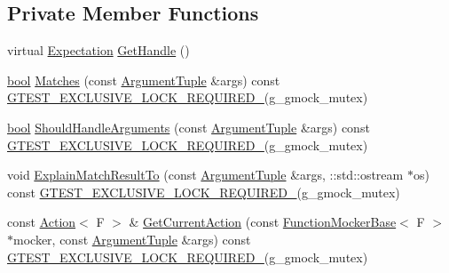 \subsection*{Private Member Functions}
\begin{DoxyCompactItemize}
\item 
virtual \hyperlink{classtesting_1_1Expectation}{Expectation} \hyperlink{classtesting_1_1internal_1_1TypedExpectation_adc2859080623243a3886a80ab62911da}{Get\+Handle} ()
\item 
\hyperlink{classbool}{bool} \hyperlink{classtesting_1_1internal_1_1TypedExpectation_a010336f587859d990b718cd74f13e617}{Matches} (const \hyperlink{classtesting_1_1internal_1_1TypedExpectation_a9a91379262d101f435809ba4556d14fa}{Argument\+Tuple} \&args) const \hyperlink{gtest-port_8h_a149f693bd59fa1bc937af54c0cdcb32f}{G\+T\+E\+S\+T\+\_\+\+E\+X\+C\+L\+U\+S\+I\+V\+E\+\_\+\+L\+O\+C\+K\+\_\+\+R\+E\+Q\+U\+I\+R\+E\+D\+\_\+}(g\+\_\+gmock\+\_\+mutex)
\item 
\hyperlink{classbool}{bool} \hyperlink{classtesting_1_1internal_1_1TypedExpectation_a833f473cc3563f566fbfe143682bd05a}{Should\+Handle\+Arguments} (const \hyperlink{classtesting_1_1internal_1_1TypedExpectation_a9a91379262d101f435809ba4556d14fa}{Argument\+Tuple} \&args) const \hyperlink{gtest-port_8h_a149f693bd59fa1bc937af54c0cdcb32f}{G\+T\+E\+S\+T\+\_\+\+E\+X\+C\+L\+U\+S\+I\+V\+E\+\_\+\+L\+O\+C\+K\+\_\+\+R\+E\+Q\+U\+I\+R\+E\+D\+\_\+}(g\+\_\+gmock\+\_\+mutex)
\item 
void \hyperlink{classtesting_1_1internal_1_1TypedExpectation_ad72e021fb66b7a91613e84644c6eb78b}{Explain\+Match\+Result\+To} (const \hyperlink{classtesting_1_1internal_1_1TypedExpectation_a9a91379262d101f435809ba4556d14fa}{Argument\+Tuple} \&args, \+::std\+::ostream $\ast$os) const \hyperlink{gtest-port_8h_a149f693bd59fa1bc937af54c0cdcb32f}{G\+T\+E\+S\+T\+\_\+\+E\+X\+C\+L\+U\+S\+I\+V\+E\+\_\+\+L\+O\+C\+K\+\_\+\+R\+E\+Q\+U\+I\+R\+E\+D\+\_\+}(g\+\_\+gmock\+\_\+mutex)
\item 
const \hyperlink{classtesting_1_1Action}{Action}$<$ F $>$ \& \hyperlink{classtesting_1_1internal_1_1TypedExpectation_a5053b8335ca295b34cd6a68f8d462602}{Get\+Current\+Action} (const \hyperlink{classtesting_1_1internal_1_1FunctionMockerBase}{Function\+Mocker\+Base}$<$ F $>$ $\ast$mocker, const \hyperlink{classtesting_1_1internal_1_1TypedExpectation_a9a91379262d101f435809ba4556d14fa}{Argument\+Tuple} \&args) const \hyperlink{gtest-port_8h_a149f693bd59fa1bc937af54c0cdcb32f}{G\+T\+E\+S\+T\+\_\+\+E\+X\+C\+L\+U\+S\+I\+V\+E\+\_\+\+L\+O\+C\+K\+\_\+\+R\+E\+Q\+U\+I\+R\+E\+D\+\_\+}(g\+\_\+gmock\+\_\+mutex)

\end{DoxyCompactItemize}
